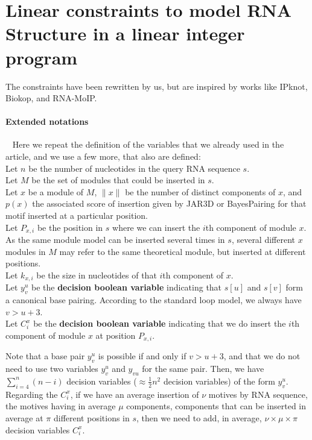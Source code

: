 \documentclass{article}
\begin{document}
\appendix
\section{Linear constraints to model RNA Structure in a linear integer program}
The constraints have been rewritten by us, but are inspired by works like IPknot, Biokop, and RNA-MoIP.

\paragraph{Extended notations} ~ Here we repeat the definition of the variables that we already used in the article, and we use a few more, that also are defined:\\
Let $n$ be the number of nucleotides in the query RNA sequence $s$.\\
Let $M$ be the set of modules that could be inserted in $s$.\\
Let $x$ be a module of $M$, $\|x\|$ be the number of distinct components of $x$, and $p(x)$ the associated score of insertion given by JAR3D or BayesPairing for that motif inserted at a particular position.\\
Let $P_{x,i}$ be the position in $s$ where we can insert the $i$th component of module $x$.\\
As the same module model can be inserted several times in $s$, several different $x$ modules in $M$ may refer to the same theoretical module, but inserted at different positions.\\
Let $k_{x,i}$ be the size in nucleotides of that $i$th component of $x$.\\
Let $y^u_v$ be the \textbf{decision boolean variable} indicating that $s[u]$ and $s[v]$ form a canonical base pairing. According to the standard loop model, we always have $v > u + 3$.\\
Let $C^x_i$ be the \textbf{decision boolean variable} indicating that we do insert the $i$th component of module $x$ at position $P_{x,i}$.


Note that a base pair $y^u_v$ is possible if and only if $v>u+3$, and that we do not need to use two variables $y^u_v$ and $y_{vu}$ for the same pair. 
Then, we have $\sum_{i=4}^n (n-i)$ decision variables ($\approx \frac{1}{2}n^2$ decision variables) of the form $y^u_v$.
Regarding the $C^x_i$, if we have an average insertion of $\nu$ motives by RNA sequence, the motives having in average $\mu$ components, components that can be inserted in average at $\pi$ different positions in $s$,
then we need to add, in average, $\nu \times \mu \times \pi$ decision variables $C^x_i$.
\end{document}
